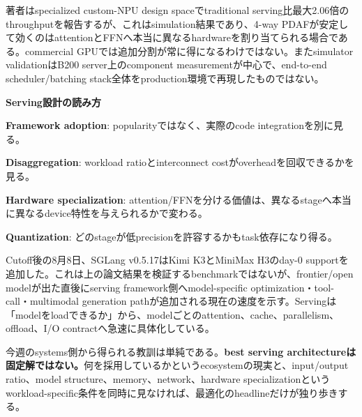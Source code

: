 著者はspecialized custom-NPU design spaceでtraditional serving比最大2.06倍のthroughputを報告するが、これはsimulation結果であり、4-way PDAFが安定して効くのはattentionとFFNへ本当に異なるhardwareを割り当てられる場合である。commercial GPUでは追加分割が常に得になるわけではない。またsimulator validationはB200 server上のcomponent measurementが中心で、end-to-end scheduler/batching stack全体をproduction環境で再現したものではない\cite{disaggregation-paper}。

\begin{tcolorbox}[enhanced,breakable,colback=SurveySoft,colframe=SurveyRule,boxrule=0.4pt,arc=1mm,left=2mm,right=2mm,top=1.5mm,bottom=1.5mm]
\textbf{Serving設計の読み方}\par\smallskip
\textbf{Framework adoption}: popularityではなく、実際のcode integrationを別に見る。\par
\textbf{Disaggregation}: workload ratioとinterconnect costがoverheadを回収できるかを見る。\par
\textbf{Hardware specialization}: attention/FFNを分ける価値は、異なるstageへ本当に異なるdevice特性を与えられるかで変わる。\par
\textbf{Quantization}: どのstageが低precisionを許容するかもtask依存になり得る。
\end{tcolorbox}

\begin{latebreaking}
Cutoff後の8月8日、SGLang v0.5.17はKimi K3とMiniMax H3のday-0 supportを追加した\cite{sglang-0517}。これは上の論文結果を検証するbenchmarkではないが、frontier/open modelが出た直後にserving framework側へmodel-specific optimization・tool-call・multimodal generation pathが追加される現在の速度を示す。Servingは「modelをloadできるか」から、modelごとのattention、cache、parallelism、offload、I/O contractへ急速に具体化している。
\end{latebreaking}

今週のsystems側から得られる教訓は単純である。\textbf{best serving architectureは固定解ではない。}何を採用しているかというecosystemの現実と、input/output ratio、model structure、memory、network、hardware specializationというworkload-specific条件を同時に見なければ、最適化のheadlineだけが独り歩きする。
